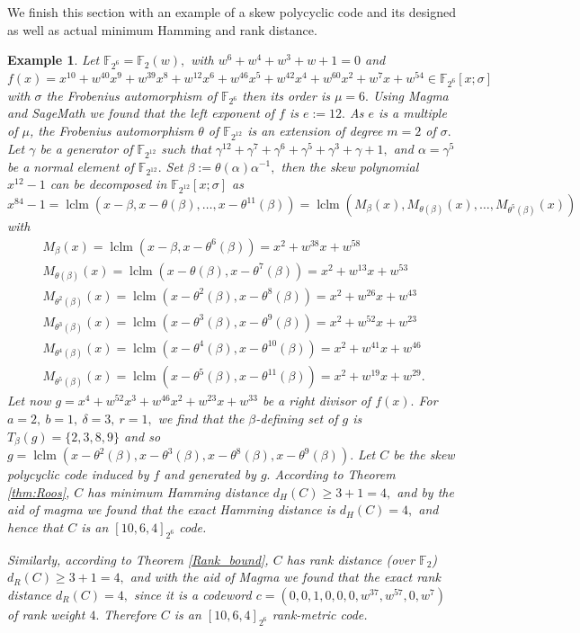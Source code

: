 \documentclass[12pt,paper]{article}
\theoremstyle{plain}
\newtheorem{example}[theorem]{Example}
\DeclareMathOperator{\lclm}{lclm}
\begin{document}
We finish this section with an example of a skew polycyclic code and its designed as well as actual minimum Hamming and rank distance.
\begin{example} 
Let $ \mathbb{F}_{2^6}= \mathbb{F}_{2}(w), $ with $ w^6 + w^4 + w^3 +  w+ 1=0 $ and  $f(x)=x^{10} + w^{40}x^9 + w^{39}x^8 + w^{12} x^6 + w^{46}x^5 + w^{42}x^4 + w^{60} x^2 + w^7x +
    w^{54}\in \mathbb{F}_{2^6}[x;\sigma]$ with $\sigma$ the Frobenius automorphism of $ \mathbb{F}_{2^6}$ then its order is $\mu=6.$ Using Magma and SageMath we found that the left exponent  of $f$ is $e:= 12.$  As $e$ is a multiple of $\mu$, the Frobenius automorphism $\theta$ of $\mathbb{F}_{2^{12}}$ is an extension of degree $ m=2 $ of $\sigma.$ Let $\gamma$ be a generator of $ \mathbb{F}_{2^{12}}$ such that $ \gamma^12 + \gamma^7 + \gamma^6 + \gamma^5 + \gamma^3 + \gamma + 1, $   and $ \alpha=\gamma^5 $ be a normal element of  $\mathbb{F}_{2^{12}}.$  Set $ \beta:=\theta(\alpha)\alpha^{-1},$ then the skew polynomial  $ x^{ 12}-1$ can be decomposed in $ \mathbb{F}_{2^{12}}[x;\sigma]$ as 
    $$  x^{ 84}-1 = \lclm \left( x-\beta, x-\theta(\beta), \ldots, x-\theta^{11}(\beta)\right)= \lclm \left( M_{\beta}(x), M_{\theta(\beta)}(x), \ldots, M_{\theta^5(\beta)}(x)\right)  $$
with
    $$\begin{array}{l}
      M_{\beta}(x)=  \lclm ( x-\beta, x-\theta^6(\beta))= x^2 + w^{38}x + w^{58} \\    
      M_{\theta(\beta)}(x)=  \lclm ( x-\theta(\beta), x-\theta^7(\beta))= x^2 + w^{13} x + w^{53}  \\
      
      M_{\theta^2(\beta)}(x)=  \lclm ( x-\theta^2(\beta), x-\theta^8(\beta))= x^2 + w^{26} x + w^{43}\\
      M_{\theta^3(\beta)}(x)=  \lclm ( x-\theta^3(\beta), x-\theta^9(\beta))= x^2 + w^{52}x + w^{23} \\ M_{\theta^4(\beta)}(x)=  \lclm ( x-\theta^4(\beta), x-\theta^10(\beta))= x^2 + w^{41} x + w^{46}\\
      M_{\theta^5(\beta)}(x)=  \lclm ( x-\theta^5(\beta), x-\theta^11(\beta))= x^2 + w^{19}x + w^{29}. 
    \end{array}
    $$
  Let now $g= x^4 + w^{52}x^3 + w^{46}x^2 + w^{23}x + w^{33 }$ be a right divisor of $f(x).$ For  $ a=2,\ b=1,\ \delta=3,\  r=1 ,$ we find that the $\beta$-defining set of $g$ is   $T_{\beta}(g)=\{ 2,3,8,9 \}$ and so $g= \lclm(x-\theta^2(\beta), x-\theta^3(\beta), x-\theta^8(\beta), x-\theta^9(\beta)) . $ Let $C$ be the skew polycyclic code induced by $f$ and generated by $g.$
  According to Theorem \ref{thm:Roos}, $C$ has minimum Hamming distance $d_H(C)\geq 3+1=4, $ and by the aid of magma we found that the exact Hamming  distance is $d_H(C)=4,$ and hence that $C$ is an $[10,6,4]_{2^6}$ code.
  
  Similarly, according to Theorem \ref{Rank_bound},  $C$  has rank distance (over $\mathbb{F}_2$) $d_R(C)\geq 3+1=4, $ and with the aid of Magma we found that the exact rank distance $d_R(C)=4,$ since it is a codeword $c=(0, 0, 1, 0, 0, 0, w^{37}, w^{57}, 0,    w^7 )$ of rank weight $4.$ Therefore $C$ is an $[10,6,4]_{2^6}$ rank-metric code.

\end{example}
\end{document}
